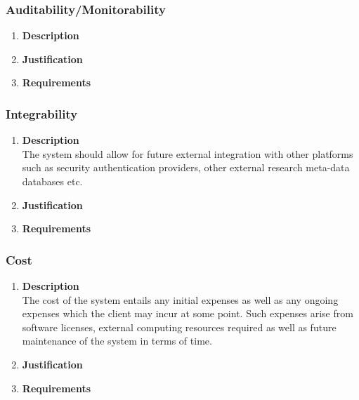 \documentclass[a4paper,10pt]{article}
\begin{document}
	\subsubsection{Auditability/Monitorability}
		\begin{enumerate}
			\item \textbf{Description} \\
			\item \textbf{Justification} \\
			\item \textbf{Requirements}\\
		\end{enumerate}

	\subsubsection{Integrability}
		\begin{enumerate}
			\item \textbf{Description} \\
				The system should allow for future external integration with other platforms such as security authentication providers, other external research meta-data databases etc.

			\item \textbf{Justification} \\
			\item \textbf{Requirements}\\
		\end{enumerate}

	\subsubsection{Cost}
		\begin{enumerate}
			\item \textbf{Description} \\
				The cost of the system entails any initial expenses as well as any ongoing expenses which the client may incur at some point. Such expenses arise from software licenses, external computing resources required as well as future maintenance of the system in terms of time.

			\item \textbf{Justification} \\
			\item \textbf{Requirements}\\
		\end{enumerate}
\end{document}
